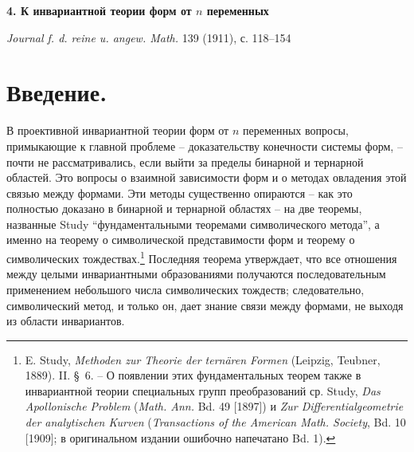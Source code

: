 \documentclass[11pt]{article}
\begin{document}
\begin{center}
{\Large\bfseries 4. К инвариантной теории форм от $n$ переменных}\par
\vspace{1.2em}
\emph{Journal f. d. reine u. angew. Math.} 139 (1911), с. 118--154
\end{center}

\section*{Введение.}
В проективной инвариантной теории форм от $n$ переменных вопросы, примыкающие к главной проблеме -- доказательству конечности системы форм, -- почти не рассматривались, если выйти за пределы бинарной и тернарной областей. Это вопросы о взаимной зависимости форм и о методах овладения этой связью между формами. Эти методы существенно опираются -- как это полностью доказано в бинарной и тернарной областях -- на две теоремы, названные Study ``фундаментальными теоремами символического метода'', а именно на теорему о символической представимости форм и теорему о символических тождествах.\footnote{E. Study, \emph{Methoden zur Theorie der ternären Formen} (Leipzig, Teubner, 1889). II. \S\ 6. -- О появлении этих фундаментальных теорем также в инвариантной теории специальных групп преобразований ср. Study, \emph{Das Apollonische Problem} (\emph{Math. Ann.} Bd. 49 [1897]) и \emph{Zur Differentialgeometrie der analytischen Kurven} (\emph{Transactions of the American Math. Society}, Bd. 10 [1909]; в оригинальном издании ошибочно напечатано Bd. 1).} Последняя теорема утверждает, что все отношения между целыми инвариантными образованиями получаются последовательным применением небольшого числа символических тождеств; следовательно, символический метод, и только он, дает знание связи между формами, не выходя из области инвариантов.
\end{document}
